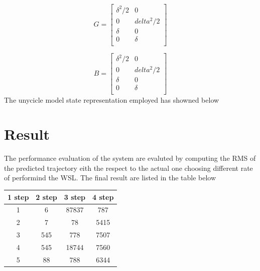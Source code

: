 \documentclass{article}
\begin{document}
\begin{multicols}{2}
    $$
    G=\begin{bmatrix}
    \delta^2/2&0\\
    0&delta^2/2\\
    \delta&0\\
    0&\delta\\
    \end{bmatrix}
    $$

    $$
    B= \begin{bmatrix}
        \delta^2/2&0\\
        0&delta^2/2\\
        \delta&0\\
        0&\delta\\
    \end{bmatrix}
    $$
   The unycicle model state representation employed has showned below

    
    \section*{Result}
    The performance evaluation of the system are evaluted by computing the RMS of the predicted trajectory eith the respect to the actual one 
    choosing different rate of performind the WSL. The final result are listed in the table below
    

\begin{center}
    \begin{tabular}{||c c c c||} 
    \hline
    1 step & 2 step & 3 step & 4 step \\ [0.5ex] 
    \hline\hline
    1 & 6 & 87837 & 787 \\ 
    \hline
    2 & 7 & 78 & 5415 \\
    \hline
    3 & 545 & 778 & 7507 \\
    \hline
    4 & 545 & 18744 & 7560 \\
    \hline
    5 & 88 & 788 & 6344 \\ [1ex] 
    \hline
   \end{tabular}
   \end{center}
   
   
    \subsection*{}
\end{multicols}
\end{document}
